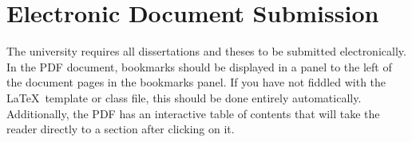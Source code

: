 \chapter{Electronic Document Submission}

The university requires all dissertations and theses to be submitted
electronically.
In the PDF document, bookmarks should be displayed in a panel to the left of the
document pages in the  bookmarks panel.
If you have not fiddled with the \LaTeX \ template or class
file, this should be done entirely automatically. Additionally, the PDF
has an interactive table of contents that will take the reader directly to
a section after clicking on it.

